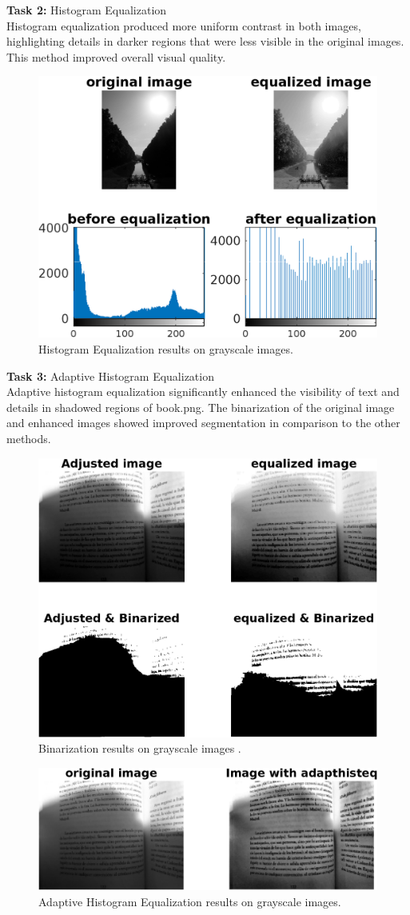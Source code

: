\documentclass[a4paper,12pt]{article}
\begin{document}
\begin{multicols}{2}
\textbf{Task 2:} Histogram Equalization\\
Histogram equalization produced more uniform contrast in both images, highlighting details in darker regions that were less visible in the original images. This method improved overall visual quality.
\begin{figure}[H]
    \centering
    \includegraphics[width=0.50\linewidth]{Images/Figure 6.png} 
    \caption{Histogram Equalization results on grayscale images.}
    \label{fig:dynamic_range_expansion}
\end{figure}

\textbf{Task 3:} Adaptive Histogram Equalization\\
Adaptive histogram equalization significantly enhanced the visibility of text and details in shadowed regions of book.png. The binarization of the original image and enhanced images showed improved segmentation in comparison to the other methods.
\begin{figure}[H]
    \centering
    \includegraphics[width=0.50\linewidth]{Images/Figure 8.png} 
    \caption{Binarization results on grayscale images .}
    \label{fig:dynamic_range_expansion}
\end{figure}

\begin{figure}[H]
    \centering
    \includegraphics[width=0.50\linewidth]{Images/Figure 9.png} 
    \caption{Adaptive Histogram Equalization results on grayscale images.}
    \label{fig:dynamic_range_expansion}
\end{figure}



\end{multicols}
\end{document}
